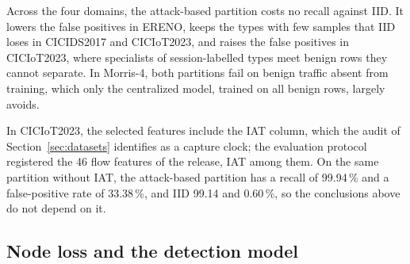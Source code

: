Across the four domains, the attack-based partition costs no recall against IID. It lowers the false positives in ERENO, keeps the types with few samples that IID loses in CICIDS2017 and CICIoT2023, and raises the false positives in CICIoT2023, where specialists of session-labelled types meet benign rows they cannot separate. In Morris-4, both partitions fail on benign traffic absent from training, which only the centralized model, trained on all benign rows, largely avoids.

In CICIoT2023, the selected features include the IAT column, which the audit of Section~\ref{sec:datasets} identifies as a capture clock; the evaluation protocol registered the 46 flow features of the release, IAT among them. On the same partition without IAT, the attack-based partition has a recall of 99.94\,\% and a false-positive rate of 33.38\,\%, and IID 99.14 and 0.60\,\%, so the conclusions above do not depend on it.

\subsection{Node loss and the detection model}
\label{sec:res-nodeloss}


